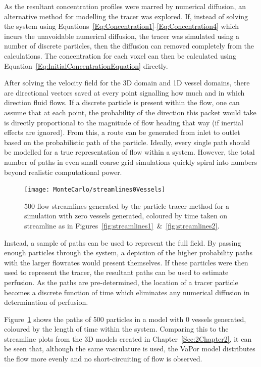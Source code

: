 \documentclass[11pt,english,a4paper,twoside,openright]{report}
\begin{document}
{{{{{{{As the resultant concentration profiles were marred by numerical diffusion, an alternative method for modelling the tracer was explored. If, instead of solving the system using Equations~\ref{Eq:Concentration1}-\ref{Eq:Concentration4} which incurs the unavoidable numerical diffusion, the tracer was simulated using a number of discrete particles, then the diffusion can removed completely from the calculations. The concentration for each voxel can then be calculated using Equation~\ref{Eq:InitialConcentrationEquation} directly.

After solving the velocity field for the 3D domain and 1D vessel domains, there are directional vectors saved at every point signalling how much and in which direction fluid flows. If a discrete particle is present within the flow, one can assume that at each point, the probability of the direction this packet would take is directly proportional to the magnitude of flow heading that way (if inertial effects are ignored). From this, a route can be generated from inlet to outlet based on the probabilistic path of the particle. Ideally, every single path should be modelled for a true representation of flow within a system. However, the total number of paths in even small coarse grid simulations quickly spiral into numbers beyond realistic computational power. 

\begin{figure}[h]
	\centering
	\texttt{[image: MonteCarlo/streamlines0Vessels]}
	\caption[500 flow streamlines generated by the particle tracer method for a simulation with zero vessels generated]{500 flow streamlines generated by the particle tracer method for a simulation with zero vessels generated, coloured by time taken on streamline as in Figures~\ref{fig:streamlines1}~\&~\ref{fig:streamlines2}.}
	\label{fig:Streamlines0Vessels}
\end{figure}

Instead, a sample of paths can be used to represent the full field. By passing enough particles through the system, a depiction of the higher probability paths with the larger flowrates would present themselves. If these particles were then used to represent the tracer, the resultant paths can be used to estimate perfusion. As the paths are pre-determined, the location of a tracer particle becomes a discrete function of time which eliminates any numerical diffusion in determination of perfusion. 

Figure~\ref{fig:Streamlines0Vessels} shows the paths of 500 particles in a model with 0 vessels generated, coloured by the length of time within the system. Comparing this to the streamline plots from the 3D models created in Chapter~\ref{Sec:2Chapter2}, it can be seen that, although the same vasculature is used, the VaPor model distributes the flow more evenly and no short-circuiting of flow is observed. 

}}}}}}}
\end{document}
